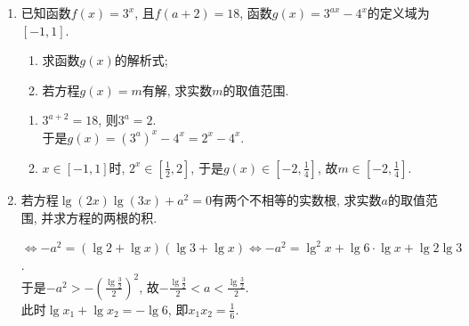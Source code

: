 \begin{enumerate}
\begin{jieda}
\begin{enumerate}[(1)]
    \item $\iff\log_2(4^x+4)=\log_22^x+\log_2(2^{x+1}-3)\iff 4^x+4=2^x(2^{x+1}-3)$. \\
    于是$(2^x+1)(2^x-4)=0$, 故$2^x=4$, 即$x=2$. 
    \item 两边取常用对数, 得$\lg^2{x}=3\lg{x}-2$, 解得$\lg{x}=1$或$2$, 即$x=10$或100. 
    
    \item 首先$x>0$, 于是$x=10^{\lg{x}}$. \\
    故方程可化为$10^{\lg^2x}+(10^{\lg{x}})^{\lg{x}}=20$, 即$2\cdot10^{\lg^2x}=20$. \\
    故$\lg^2x=1$, 即$x=\frac{1}{10}$或10. 
    \end{enumerate}
    \end{jieda}
    \begin{vspace_}
        \vsp[3]
    \end{vspace_}
    \item 已知函数$f(x)=3^x$, 且$f(a+2)=18$, 函数$g(x)=3^{ax}-4^x$的定义域为$[-1,1]$. 
    \begin{enumerate}[(1)]
    \item 求函数$g(x)$的解析式; 
    \item 若方程$g(x)=m$有解, 求实数$m$的取值范围.
    \end{enumerate}
    \begin{jieda}
    \begin{enumerate}[(1)]
    \item $3^{a+2}=18$, 则$3^a=2$. \\
    于是$g(x)=(3^a)^x-4^x=2^x-4^x$. 
    \item $x\in[-1,1]$时, $2^x\in[\frac{1}{2},2]$, 于是$g(x)\in[-2,\frac{1}{4}]$, 故$m\in[-2,\frac{1}{4}]$. 
    \end{enumerate}
    \end{jieda}
    \begin{vspace_}
        \vsp[3]
    \end{vspace_}

    \item 若方程$\lg(2x)\lg(3x)+a^2=0$有两个不相等的实数根, 求实数$a$的取值范围, 并求方程的两根的积. 
    
    \begin{jieda}
    $\iff -a^2=(\lg2+\lg{x})(\lg3+\lg{x})\iff -a^2=\lg^2x+\lg6\cdot\lg{x}+\lg2\lg3$. \\
    于是$-a^2>-\left(\frac{\lg\frac{3}{2}}{2}\right)^2$, 故$-\frac{\lg\frac{3}{2}}{2}<a<\frac{\lg\frac{3}{2}}{2}$. \\
    此时$\lg{x_1}+\lg{x_2}=-\lg6$, 即$x_1x_2=\frac{1}{6}$. 
    \end{jieda}
    \begin{vspace_}
        \vsp[3]
    \end{vspace_}
    

\end{enumerate}
